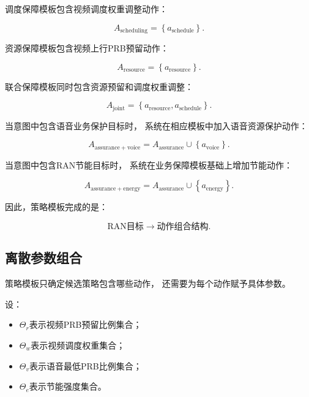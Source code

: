 \documentclass[lang=cn,12pt]{elegantbook}
\begin{document}
调度保障模板包含视频调度权重调整动作：

\begin{equation}
A_{\mathrm{scheduling}}
=
\left\{
a_{\mathrm{schedule}}
\right\}.
\label{eq:scheduling_template_reduced}
\end{equation}

资源保障模板包含视频上行PRB预留动作：

\begin{equation}
A_{\mathrm{resource}}
=
\left\{
a_{\mathrm{resource}}
\right\}.
\label{eq:resource_template_reduced}
\end{equation}

联合保障模板同时包含资源预留和调度权重调整：

\begin{equation}
A_{\mathrm{joint}}
=
\left\{
a_{\mathrm{resource}},
a_{\mathrm{schedule}}
\right\}.
\label{eq:joint_template_reduced}
\end{equation}

当意图中包含语音业务保护目标时，
系统在相应模板中加入语音资源保护动作：

\begin{equation}
A_{\mathrm{assurance+voice}}
=
A_{\mathrm{assurance}}
\cup
\left\{
a_{\mathrm{voice}}
\right\}.
\label{eq:voice_protection_template_reduced}
\end{equation}

当意图中包含RAN节能目标时，
系统在业务保障模板基础上增加节能动作：

\begin{equation}
A_{\mathrm{assurance+energy}}
=
A_{\mathrm{assurance}}
\cup
\left\{
a_{\mathrm{energy}}
\right\}.
\label{eq:energy_template_reduced}
\end{equation}

因此，策略模板完成的是：

\begin{equation}
\text{RAN目标}
\longrightarrow
\text{动作组合结构}.
\label{eq:objective_to_policy_template}
\end{equation}


\subsection*{离散参数组合}

策略模板只确定候选策略包含哪些动作，
还需要为每个动作赋予具体参数。

设：

\begin{itemize}
    \item $\Theta_r$表示视频PRB预留比例集合；
    \item $\Theta_w$表示视频调度权重集合；
    \item $\Theta_v$表示语音最低PRB比例集合；
    \item $\Theta_e$表示节能强度集合。
\end{itemize}
\end{document}

